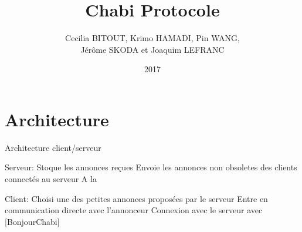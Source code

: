 \documentclass[12pt]{article}
\title{Chabi Protocole}
\author{
  Cecilia BITOUT, Krimo HAMADI, Pin WANG, \\
  Jérôme SKODA et Joaquim LEFRANC
}
\date{2017}
\begin{document}
\maketitle
\section{Architecture}

Architecture client/serveur

Serveur:
Stoque les annonces reçues
Envoie les annonces non obsoletes des clients connectés au serveur
A la



Client:
Choisi une des petites annonces proposées par le serveur
Entre en communication directe avec l'annonceur
Connexion avec le serveur avec [BonjourChabi]
\end{document}
